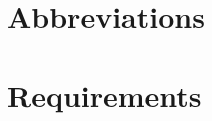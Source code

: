 %

%

\section{\longname Abbreviations}


\newpage

\section{\longname Requirements}

\setcounter{section}{0}
\renewcommand{\thesection}{\shortname\arabic{section}}
\renewcommand{\thesubsection}{\shortname\arabic{section}.\arabic{subsection}}
\renewcommand{\thesubsubsection}{\shortname\arabic{section}.\arabic{subsection}.\arabic{subsubsection}}



%

 


%





















